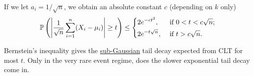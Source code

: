 \begin{note}
	If we let \(a_i = 1 / \sqrt{n} \), we obtain an absolute constant \(c\) (depending on \(k\) only)
	\[
		\mathbb{P} \left( \left\vert \frac{1}{\sqrt{n} } \sum_{i=1}^{n} (X_i - \mu _i) \right\vert \geq t \right) \leq
		\begin{dcases}
			2e^{-ct^{2} },    & \text{ if } 0 < t < c\sqrt{n}  ; \\
			2e^{-t\sqrt{n} }, & \text{ if } t > c\sqrt{n} .
		\end{dcases}
	\]
\end{note}

\begin{remark}
	Bernstein's inequality gives the \hyperref[def:sub-Gaussian]{sub-Gaussian} tail decay expected from CLT for most \(t\). Only in the very rare event regime, does the slower exponential tail decay come in.
\end{remark}